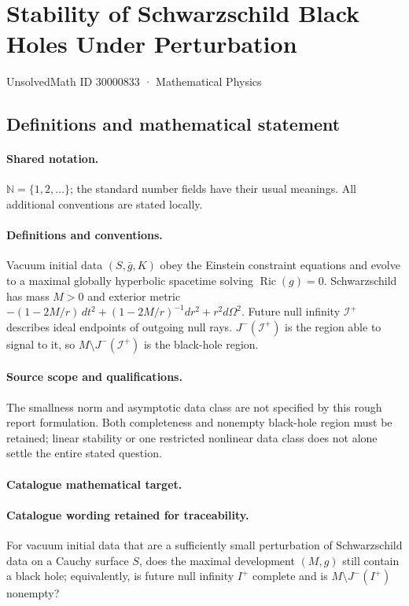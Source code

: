 \documentclass[11pt]{article}
\begin{document}
\setcounter{section}{30000832}
\section{Stability of Schwarzschild Black Holes Under Perturbation}\label{30000833}
{\small UnsolvedMath ID 30000833 · Mathematical Physics}
\subsection{Definitions and mathematical statement}

\paragraph{Shared notation.}$\mathbb N=\{1,2,\ldots\}$; the standard number fields have their usual meanings. All additional conventions are stated locally.


\paragraph{Definitions and conventions.} Vacuum initial data $(S,\bar g,K)$ obey the Einstein constraint equations and evolve to a maximal globally hyperbolic spacetime solving $\operatorname{Ric}(g)=0$. Schwarzschild has mass $M>0$ and exterior metric $-(1-2M/r)\,dt^2+(1-2M/r)^{-1}dr^2+r^2d\Omega^2$. Future null infinity $\mathcal I^+$ describes ideal endpoints of outgoing null rays. $J^-(\mathcal I^+)$ is the region able to signal to it, so $M\setminus J^-(\mathcal I^+)$ is the black-hole region.

\paragraph{Source scope and qualifications.} The smallness norm and asymptotic data class are not specified by this rough report formulation. Both completeness and nonempty black-hole region must be retained; linear stability or one restricted nonlinear data class does not alone settle the entire stated question.

\paragraph{Catalogue mathematical target.}
\paragraph{Catalogue wording retained for traceability.}
For vacuum initial data that are a sufficiently small perturbation of Schwarzschild data on a Cauchy surface $S$, does the maximal development $(M,g)$ still contain a black hole; equivalently, is future null infinity $I^+$ complete and is $M\setminus J^-(I^+)$ nonempty?
\end{document}
